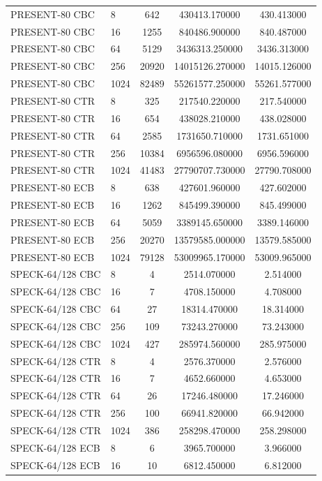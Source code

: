 \begin{table}
\begin{tabular}{@{}llccc@{}}
PRESENT-80 CBC & 8 & 642 & 430413.170000 & 430.413000 \\
PRESENT-80 CBC & 16 & 1255 & 840486.900000 & 840.487000 \\
PRESENT-80 CBC & 64 & 5129 & 3436313.250000 & 3436.313000 \\
PRESENT-80 CBC & 256 & 20920 & 14015126.270000 & 14015.126000 \\
PRESENT-80 CBC & 1024 & 82489 & 55261577.250000 & 55261.577000 \\
PRESENT-80 CTR & 8 & 325 & 217540.220000 & 217.540000 \\
PRESENT-80 CTR & 16 & 654 & 438028.210000 & 438.028000 \\
PRESENT-80 CTR & 64 & 2585 & 1731650.710000 & 1731.651000 \\
PRESENT-80 CTR & 256 & 10384 & 6956596.080000 & 6956.596000 \\
PRESENT-80 CTR & 1024 & 41483 & 27790707.730000 & 27790.708000 \\
PRESENT-80 ECB & 8 & 638 & 427601.960000 & 427.602000 \\
PRESENT-80 ECB & 16 & 1262 & 845499.390000 & 845.499000 \\
PRESENT-80 ECB & 64 & 5059 & 3389145.650000 & 3389.146000 \\
PRESENT-80 ECB & 256 & 20270 & 13579585.000000 & 13579.585000 \\
PRESENT-80 ECB & 1024 & 79128 & 53009965.170000 & 53009.965000 \\
SPECK-64/128 CBC & 8 & 4 & 2514.070000 & 2.514000 \\
SPECK-64/128 CBC & 16 & 7 & 4708.150000 & 4.708000 \\
SPECK-64/128 CBC & 64 & 27 & 18314.470000 & 18.314000 \\
SPECK-64/128 CBC & 256 & 109 & 73243.270000 & 73.243000 \\
SPECK-64/128 CBC & 1024 & 427 & 285974.560000 & 285.975000 \\
SPECK-64/128 CTR & 8 & 4 & 2576.370000 & 2.576000 \\
SPECK-64/128 CTR & 16 & 7 & 4652.660000 & 4.653000 \\
SPECK-64/128 CTR & 64 & 26 & 17246.480000 & 17.246000 \\
SPECK-64/128 CTR & 256 & 100 & 66941.820000 & 66.942000 \\
SPECK-64/128 CTR & 1024 & 386 & 258298.470000 & 258.298000 \\
SPECK-64/128 ECB & 8 & 6 & 3965.700000 & 3.966000 \\
SPECK-64/128 ECB & 16 & 10 & 6812.450000 & 6.812000 \\

\end{tabular}
\end{table}
